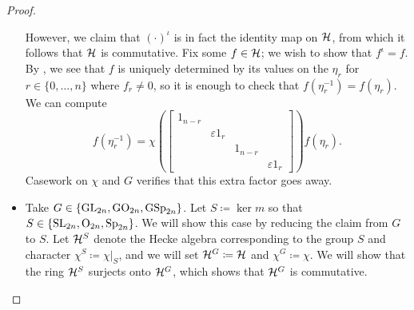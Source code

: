 \begin{proof}
\begin{itemize}
        However, we claim that $(\cdot)^\iota$ is in fact the identity map on $\mathcal{H}$, from which it follows that $\mathcal{H}$ is commutative. Fix some $f\in\mathcal{H}$; we wish to show that $f^\iota=f$. By , we see that $f$ is uniquely determined by its values on the $\eta_r$ for $r\in\{0,\ldots,n\}$ where $f_r\ne0$, so it is enough to check that $f\left(\eta_r^{-1}\right)=f(\eta_r)$. We can compute
        \[f\left(\eta_r^{-1}\right)=\chi\left(\begin{bmatrix}
            1_{n-r} \\ & \varepsilon1_{r} \\ && 1_{n-r} \\ &&& \varepsilon1_{r}
        \end{bmatrix}\right)f(\eta_r).\]
        Casework on $\chi$ and $G$ verifies that this extra factor goes away.

        \item Take $G\in\{\mathrm{GL}_{2n},\mathrm{GO}_{2n},\mathrm{GSp}_{2n}\}$. Let $S\coloneqq\ker m$ so that $S\in\{\mathrm{SL}_{2n},\mathrm{O}_{2n},\mathrm{Sp}_{2n}\}$.%
        We will show this case by reducing the claim from $G$ to $S$. Let $\mathcal{H}^S$ denote the Hecke algebra corresponding to the group $S$ and character $\chi^S\coloneqq\chi|_S$, and we will set $\mathcal{H}^G\coloneqq\mathcal{H}$ and $\chi^G\coloneqq\chi$. We will show that the ring $\mathcal{H}^S$ surjects onto $\mathcal{H}^G$, which shows that $\mathcal{H}^G$ is commutative.%
        

\end{itemize}
\end{proof}
